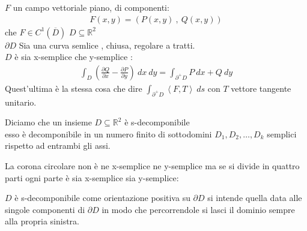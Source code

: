 \documentclass[a4paper, oneside]{article}
\begin{document}
\begin{lemma}
   $F$ un campo vettoriale piano, di componenti:
  \begin{gather*}
    F(x,y) = \left( P(x,y) \ , \ Q(x,y) \right)
  \end{gather*}
   che $F \in C^1 (\overline{D})$ 
   $D \subseteq \mathbb{R}^2$\\ 
   $\partial D$ Sia una curva semlice , chiusa, regolare a tratti.\\
   $D$ è sia x-semplice che y-semplice :
  \begin{gather*}
    \int_D \left( \frac{\partial Q}{\partial x} - \frac{\partial P}{\partial y} \right) \ dx \ dy = \int_{\partial^+ D} P \ dx + Q \ dy
  \end{gather*}  
  Quest'ultima è la stessa cosa che dire $\int_{\partial^+ D} \left\langle F,T \right\rangle \ ds $ con $T$ vettore tangente unitario.
\end{lemma}

\begin{definition}
    Diciamo che un insieme $D\subseteq \mathbb{R}^2$ è s-decomponibile\\
     esso è decomponibile in un numero finito di sottodomini $D_1, D_2, \dots , D_k$ semplici rispetto ad entrambi gli assi.
\end{definition}

\begin{observation}
  La corona circolare non è ne x-semplice ne y-semplice ma se si divide in quattro parti ogni parte è sia x-semplice sia y-semplice:
  \begin{center}
  \end{center}
\end{observation}


\begin{observation}
     $D$ è s-decomponibile come orientazione positiva su $\partial D$ si intende quella data alle singole componenti di $\partial D$ in modo che percorrendole si lasci il dominio sempre alla propria sinistra.\\
\end{observation}
\end{document}
